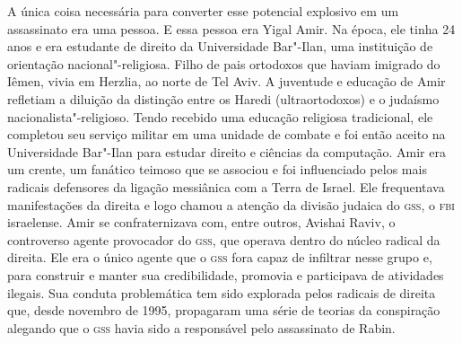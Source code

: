 A única coisa necessária para converter esse potencial explosivo em um
assassinato era uma pessoa. E essa pessoa era Yigal Amir. Na época, ele
tinha 24 anos e era estudante de direito da Universidade
Bar"-Ilan, uma instituição de orientação nacional"-religiosa. Filho de
pais ortodoxos que haviam imigrado do Iêmen, vivia em Herzlia, ao
norte de Tel Aviv. A juventude e educação de Amir refletiam a diluição
da distinção entre os Haredi (ultraortodoxos) e o judaísmo
nacionalista"-religioso. Tendo recebido uma educação religiosa
tradicional, ele completou seu serviço militar em uma unidade de combate
e foi então aceito na Universidade Bar"-Ilan para estudar direito e
ciências da computação. Amir era um crente, um fanático teimoso que se
associou e foi influenciado pelos mais radicais defensores da ligação
messiânica com a Terra de Israel. Ele frequentava manifestações da
direita e logo chamou a atenção da divisão judaica do
\textsc{gss},  
o \textsc{fbi} israelense. Amir se confraternizava com, entre outros, Avishai Raviv, o controverso agente provocador do \textsc{gss}, que operava dentro do
núcleo radical da direita. Ele era o único agente que o \textsc{gss} fora capaz
de infiltrar nesse grupo e, para construir e manter sua credibilidade,
promovia e participava de atividades ilegais. Sua conduta problemática
tem sido explorada pelos radicais de direita que, desde novembro de
1995, propagaram uma série de teorias da conspiração alegando que o \textsc{gss}
havia sido a responsável pelo assassinato de Rabin.

